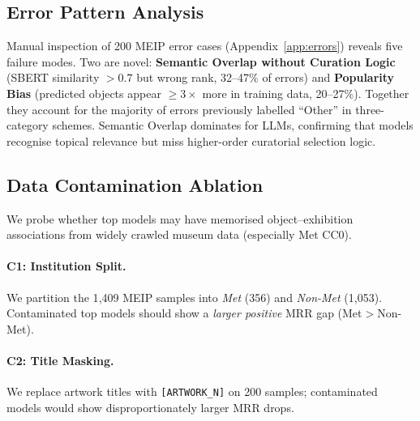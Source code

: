 \documentclass[11pt]{article}
\newcommand{\meip}{\textsc{MEIP}}
\begin{document}
\subsection{Error Pattern Analysis}
\label{sec:errors}

Manual inspection of 200 MEIP error cases (Appendix~\ref{app:errors}) reveals five failure modes.
Two are novel: \textbf{Semantic Overlap without Curation Logic}
(SBERT similarity $>0.7$ but wrong rank, 32--47\% of errors)
and \textbf{Popularity Bias} (predicted objects appear $\ge 3\times$ more in training data, 20--27\%).
Together they account for the majority of errors previously labelled ``Other'' in three-category schemes.
Semantic Overlap dominates for LLMs, confirming that models recognise topical relevance
but miss higher-order curatorial selection logic.

\subsection{Data Contamination Ablation}
\label{sec:contamination}

We probe whether top models may have memorised object--exhibition
associations from widely crawled museum data (especially Met CC0).

\paragraph{C1: Institution Split.}
We partition the 1{,}409 \meip{} samples into \textit{Met} (356) and
\textit{Non-Met} (1{,}053).
Contaminated top models should show a \emph{larger positive} MRR gap (Met$>$Non-Met).

\paragraph{C2: Title Masking.}
We replace artwork titles with \texttt{[ARTWORK\_N]} on 200 samples;
contaminated models would show disproportionately larger MRR drops.
\end{document}
